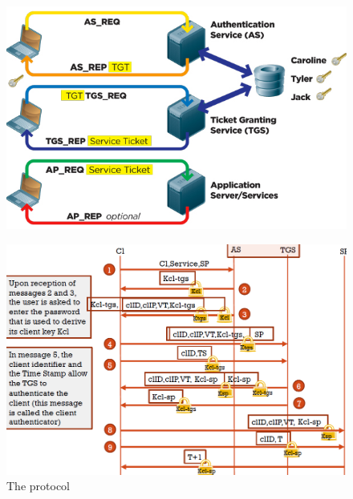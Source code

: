 \begin{figure}
	\centering
	\includegraphics[width=0.7\linewidth]{Images/Chapter4/kerberos1}
	\caption{}
	\label{fig:kerberos1}
\end{figure}

\begin{figure}
	\centering
	\includegraphics[width=0.7\linewidth]{Images/Chapter4/kerberos2}
	\caption{The protocol}
	\label{fig:kerberos2}
\end{figure}

